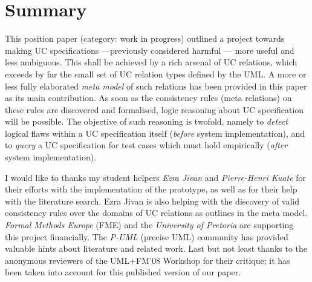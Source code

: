 \section{Summary}


This position paper (category: work in progress) outlined 
a project towards making UC specifications ---previously 
considered harmful \cite{Simons}--- more useful and less 
ambiguous. This shall be achieved by a rich arsenal of UC 
relations, which exceeds by far the small set of UC relation 
types defined by the UML. A more or less fully elaborated 
\emph{meta model} of such relations has been provided 
in this paper as its main contribution. As soon as the 
consistency rules (meta relations) on these rules are 
discovered and formalised, logic reasoning about UC 
specification will be possible. The objective of such 
reasoning is twofold, namely to \emph{detect} logical 
flaws within a UC specification itself (\emph{before} 
system implementation), and to \emph{query} a UC 
specification for test cases which must hold empirically 
(\emph{after} system implementation).
\begin{acknowledgements}
I would like to thanks my student helpers \emph{Ezra Jivan} 
and \emph{Pierre-Henri Kuate} for their efforts with the 
implementation of the prototype, as well as for their 
help with the literature search. Ezra Jivan is also 
helping with the discovery of valid consistency rules 
over the domains of UC relations as outlines in the meta 
model. \emph{Formal Methods Europe} (FME) and the 
\emph{University of Pretoria} are supporting this project 
financially. The \emph{P-UML} (precise UML) community has 
provided valuable hints about literature and related work. 
Last but not least thanks to the anonymous reviewers of 
the UML$+$FM'08 Workshop for their critique; it has been 
taken into account for this published version of our paper.
\end{acknowledgements}

